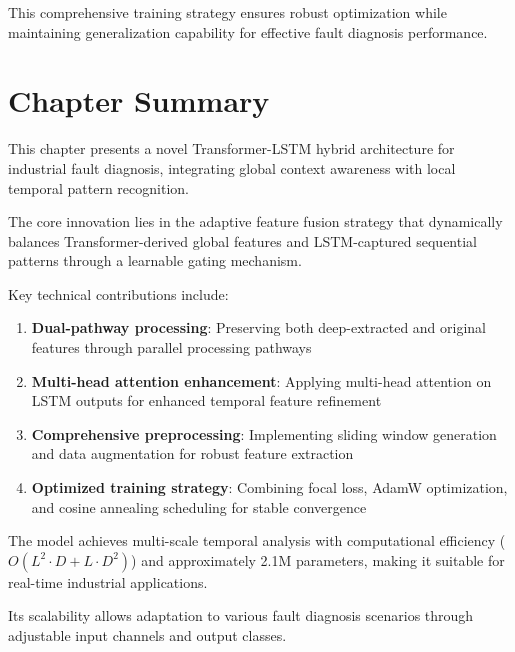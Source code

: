 This comprehensive training strategy ensures robust optimization while maintaining generalization capability for effective fault diagnosis performance.

\section{Chapter Summary}
\label{sec:hybrid_model:summary}

This chapter presents a novel Transformer-LSTM hybrid architecture for industrial fault diagnosis, integrating global context awareness with local temporal pattern recognition.

The core innovation lies in the adaptive feature fusion strategy that dynamically balances Transformer-derived global features and LSTM-captured sequential patterns through a learnable gating mechanism.

Key technical contributions include:

\begin{enumerate}
    \item \textbf{Dual-pathway processing}: Preserving both deep-extracted and original features through parallel processing pathways
    \item \textbf{Multi-head attention enhancement}: Applying multi-head attention on LSTM outputs for enhanced temporal feature refinement
    \item \textbf{Comprehensive preprocessing}: Implementing sliding window generation and data augmentation for robust feature extraction
    \item \textbf{Optimized training strategy}: Combining focal loss, AdamW optimization, and cosine annealing scheduling for stable convergence
\end{enumerate}

The model achieves multi-scale temporal analysis with computational efficiency ($O(L^2 \cdot D + L \cdot D^2)$) and approximately 2.1M parameters, making it suitable for real-time industrial applications.

Its scalability allows adaptation to various fault diagnosis scenarios through adjustable input channels and output classes.

